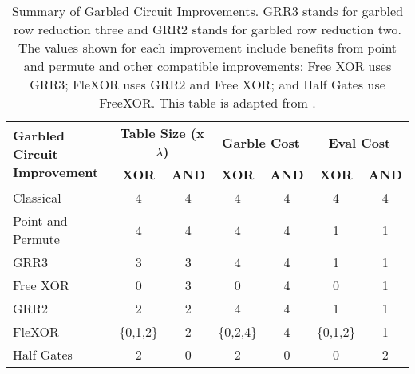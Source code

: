 \begin{table}[t]
    \centering
    \renewcommand{\arraystretch}{1.2}
    \normalsize
    \begin{adjustbox}{width=1\textwidth}
        \begin{tabular}{|p{5cm}|c|c|c|c|c|c|}
            \hline
            \multirow{2}{5cm}{\centering \textbf{Garbled Circuit Improvement}} & 
            \multicolumn{2}{c|}{\textbf{Table Size (x$\lambda$)}} & 
            \multicolumn{2}{c|}{\textbf{Garble Cost}} & 
            \multicolumn{2}{c|}{\textbf{Eval Cost}} \\
            \cline{2-7}
            & \textbf{XOR} & \textbf{AND} & \textbf{XOR} & \textbf{AND}  & \textbf{XOR} & \textbf{AND} \\
            \hline
            Classical & 4 & 4 & 4 & 4 & 4 & 4 \\ \hline
            Point and Permute & 4 & 4 & 4 & 4 & 1 & 1 \\ \hline
            GRR3 & 3 & 3 & 4 & 4  & 1 & 1 \\ \hline
            Free XOR & 0 & 3 & 0 & 4 & 0 & 1  \\ \hline
            GRR2  & 2 & 2 & 4 & 4 & 1 & 1  \\ \hline
            FleXOR & \{0,1,2\} & 2 & \{0,2,4\} & 4 & \{0,1,2\} & 1  \\ \hline
            Half Gates & 2 & 0 & 2 & 0 & 0 & 2  \\ \hline
        \end{tabular}
    \end{adjustbox}
    \caption{Summary of Garbled Circuit Improvements. 
    GRR3 stands for garbled row reduction three and GRR2 stands for garbled row reduction two. 
    The values shown for each improvement include benefits from point and permute and other compatible improvements: 
    Free XOR uses GRR3; FleXOR uses GRR2 and Free XOR; and Half Gates use FreeXOR.
    This table is adapted from \cite{twohalves}.}
    \label{tbl:improvements}
\end{table}


